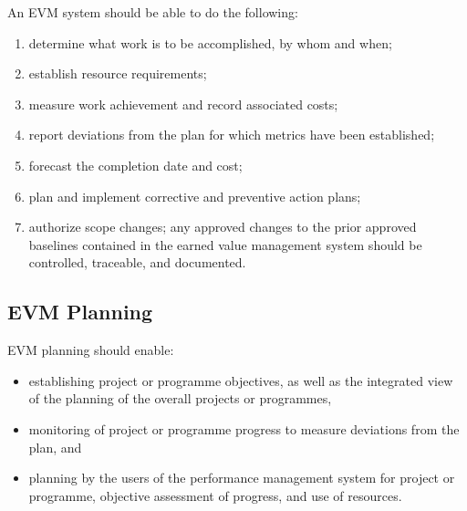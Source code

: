 \documentclass[letterpaper,10pt,english]{jupyterBook}
\begin{document}
\sphinxAtStartPar
An EVM system should be able to do the following:
\begin{enumerate}
%
\item {} 
\sphinxAtStartPar
determine what work is to be accomplished, by whom and when;

\item {} 
\sphinxAtStartPar
establish resource requirements;

\item {} 
\sphinxAtStartPar
measure work achievement and record associated costs;

\item {} 
\sphinxAtStartPar
report deviations from the plan for which metrics have been established;

\item {} 
\sphinxAtStartPar
forecast the completion date and cost;

\item {} 
\sphinxAtStartPar
plan and implement corrective and preventive action plans;

\item {} 
\sphinxAtStartPar
authorize scope changes; any approved changes to the prior approved baselines contained in the earned value management system should be controlled, traceable, and documented.

\end{enumerate}


\subsection{EVM Planning}
\label{\detokenize{PM/evm:evm-planning}}
\sphinxAtStartPar
EVM planning should enable:
\begin{itemize}
\item {} 
\sphinxAtStartPar
establishing project or programme objectives, as well as the integrated view of the planning of the overall projects or programmes,

\item {} 
\sphinxAtStartPar
monitoring of project or programme progress to measure deviations from the plan, and

\item {} 
\sphinxAtStartPar
planning by the users of the performance management system for project or programme, objective assessment of progress, and use of resources.

\end{itemize}
\end{document}
